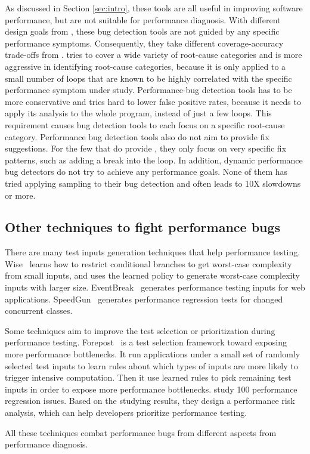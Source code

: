As discussed in 
Section \ref{sec:intro}, these tools are all useful in improving software
performance, but are not suitable for performance diagnosis.
With different design goals from \Tool, these bug detection tools are not 
guided by any specific
performance symptoms. Consequently, they take different coverage-accuracy
trade-offs from \Tool. \Tool tries to cover a wide variety of root-cause 
categories and is more aggressive in identifying root-cause categories, because
it is only applied to a small number of loops that are known to be highly
correlated with the specific performance symptom under study.
Performance-bug detection tools has to be more conservative and tries hard
to lower false positive rates, because it needs to apply its analysis to the
whole program, instead of just a few loops. This requirement causes bug
detection tools to each focus on a specific root-cause category.
Performance bug detection tools also do not aim to provide fix suggestions.
For the few that do provide \cite{CARAMEL}, they only focus on very specific
fix patterns, such as adding a break into the loop. 
In addition, dynamic performance bug detectors do not try to achieve any
performance goals. None of them has tried applying sampling to their
bug detection and often leads to 10X slowdowns or more.

\subsection{Other techniques to fight performance bugs}

There are many test inputs generation techniques that help
performance testing. 
Wise~\cite{WISE} learns how to restrict conditional branches to get worst-case complexity from small inputs, 
and uses the learned policy to generate worst-case complexity inputs with 
larger size. 
EventBreak~\cite{EventBreak} generates performance testing inputs 
for web applications. 
SpeedGun~\cite{SpeedGun} generates performance regression tests for 
changed concurrent classes.

Some techniques aim to improve the test selection or prioritization during 
performance testing. 
Forepost~\cite{Forepost} is a test selection framework toward exposing more performance bottlenecks. 
It run applications under a small set of randomly selected test inputs to learn rules 
about which types of inputs are more likely to trigger intensive computation. 
Then it use learned rules to pick remaining test inputs in order to expose more performance bottlenecks. 
\citet{Huang:2014:PRT:2568225.2568232} study 100 performance regression issues. Based on the studying results, 
they design a performance risk analysis, which can help developers prioritize performance testing.  

All these techniques combat performance bugs from different aspects from performance diagnosis.
